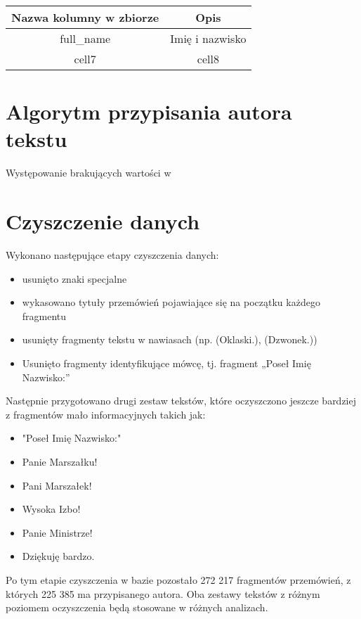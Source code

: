 \documentclass[a4paper,11pt,twoside]{report}
\theoremstyle{definition}
\begin{document}
\begin{center}
\begin{tabular}{ |c|c| } 
 \hline
 Nazwa kolumny w zbiorze & Opis  \\ \hline
 full\_name & Imię i nazwisko \\  \hline
 cell7 & cell8 \\ 
 \hline
\end{tabular}
\end{center}

\section{Algorytm przypisania autora tekstu}
Występowanie brakujących wartości w \\ 

\section{Czyszczenie danych}
Wykonano następujące etapy czyszczenia danych: 
\begin{itemize}
 \item usunięto znaki specjalne 
 \item wykasowano tytuły przemówień pojawiające się na początku każdego fragmentu
 \item usunięty fragmenty tekstu w nawiasach (np. (Oklaski.), (Dzwonek.))
 \item Usunięto fragmenty identyfikujące mówcę, tj. fragment „Poseł Imię Nazwisko:”
\end{itemize}

Następnie przygotowano drugi zestaw tekstów, które oczyszczono jeszcze bardziej z fragmentów mało informacyjnych takich jak:
\begin{itemize}
 \item "Poseł Imię Nazwisko:"
 \item Panie Marszałku!
 \item Pani Marszałek!
 \item Wysoka Izbo!
 \item Panie Ministrze!
 \item Dziękuję bardzo.

\end{itemize}

Po tym etapie czyszczenia w bazie pozostało 272 217 fragmentów przemówień, z których 225 385 ma przypisanego autora. Oba zestawy tekstów z różnym poziomem oczyszczenia będą stosowane w różnych analizach.
\end{document}
